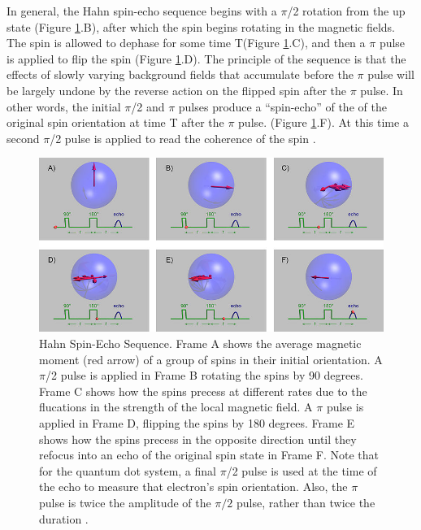 \documentclass[pdftex,12pt,a4paper]{article}
\begin{document}
In general, the Hahn spin-echo sequence begins with a $\pi$/2 rotation from the up state (Figure \ref{fig:Hahn}.B), after which the spin begins rotating in the magnetic fields. The spin is allowed to dephase for some time T(Figure \ref{fig:Hahn}.C), and then a $\pi$ pulse is applied to flip the spin (Figure \ref{fig:Hahn}.D). The principle of the sequence is that the effects of slowly varying background fields that accumulate before the $\pi$ pulse will be largely undone by the reverse action on the flipped spin after the $\pi$ pulse. In other words, the initial $\pi$/2 and $\pi$ pulses produce a “spin-echo” of the of the original spin orientation at time T after the $\pi$ pulse. (Figure \ref{fig:Hahn}.F). At this time a second $\pi$/2 pulse is applied to read the coherence of the spin 
\cite{Hahn_Spin_Echo}.


\begin{figure}[H]
  \centering
    \includegraphics[scale=.450]{HahnSpinEcho}
  \caption{Hahn Spin-Echo Sequence. Frame A shows the average magnetic moment (red arrow) of a group of spins in their initial orientation. A $\pi$/2 pulse is applied in Frame B rotating the spins by 90 degrees. Frame C shows how the spins precess at different rates due to the flucations in the strength of the local magnetic field. A $\pi$ pulse is applied in Frame D, flipping the spins by 180 degrees. Frame E shows how the spins precess in the opposite direction until they refocus into an echo of the original spin state in Frame F. Note that for the quantum dot system, a final $\pi$/2 pulse is used at the time of the echo to measure that electron’s spin orientation. Also, the $\pi$ pulse is twice the amplitude of the $\pi/2$ pulse, rather than twice the duration \cite{spin_2014}.}
  \label{fig:Hahn}
\end{figure}
\end{document}
